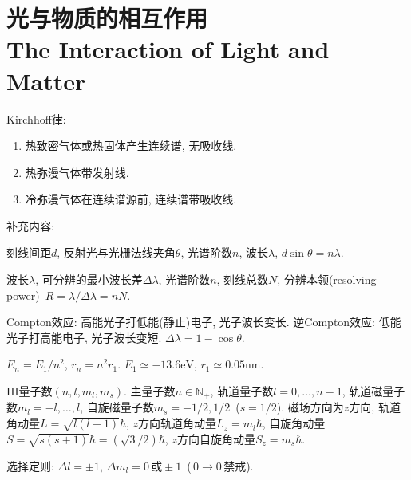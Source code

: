\chapter{光与物质的相互作用\\The Interaction of Light and Matter}

Kirchhoff律:
\begin{enumerate}
    \item 热致密气体或热固体产生连续谱, 无吸收线.
    \item 热弥漫气体带发射线.
    \item 冷弥漫气体在连续谱源前, 连续谱带吸收线.
\end{enumerate}

补充内容:

刻线间距$d$, 反射光与光栅法线夹角$\theta$, 光谱阶数$n$, 波长$\lambda$, $d\sin\theta=n\lambda$.

波长$\lambda$, 可分辨的最小波长差$\Delta\lambda$, 光谱阶数$n$, 刻线总数$N$, 分辨本领(resolving power)~$R=\lambda/\Delta\lambda=nN$.

Compton效应: 高能光子打低能(静止)电子, 光子波长变长. 逆Compton效应: 低能光子打高能电子, 光子波长变短. $\Delta\lambda=1-\cos\theta$.

$E_n=E_1/n^2$, $r_n=n^2r_1$. $E_1\simeq-13.6\text{eV}$, $r_1\simeq0.05\text{nm}$.

HI量子数$(n,l,m_l,m_s)$. 主量子数$n\in\mathbb{N}_+$, 轨道量子数$l=0,\dots,n-1$, 轨道磁量子数$m_l=-l,\dots,l$, 自旋磁量子数$m_s=-1/2,1/2$~($s=1/2$). 磁场方向为$z$方向, 轨道角动量$L=\sqrt{l(l+1)}\hbar$, $z$方向轨道角动量$L_z=m_l\hbar$, 自旋角动量$S=\sqrt{s(s+1)}\hbar=(\sqrt{3}/2)\hbar$, $z$方向自旋角动量$S_z=m_s\hbar$.

选择定则: $\Delta l=\pm1$, $\Delta m_l=0\,\text{或}\pm1$~($\,0\to0\,\text{禁戒}$).
